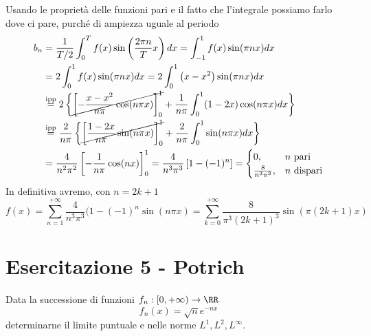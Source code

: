 Usando le proprietà delle funzioni pari e il fatto che l'integrale possiamo farlo dove ci pare, purché di ampiezza uguale al periodo
\begin{equation*}
\begin{aligned}
b_{n} & = \frac{1}{T/2}\int^{T}_{0} f(x)\sin\left(\frac{2\pi n}{T} x\right) dx = \int^{1}_{- 1} f(x)\sin(\pi nx) dx\\
 & = 2\int^{1}_{0} f(x)\sin(\pi nx) dx = 2\int^{1}_{0}\left(x - x^{2}\right)\sin(\pi nx) dx\\
 & \overset{\text{ipp}}{=} 2\left\{\cancel{\left[ - \frac{x - x^{2}}{n\pi}\cos(n\pi x)\right]^{1}_{0}} + \frac{1}{n\pi}\int^{1}_{0}(1 - 2x)\cos(n\pi x) dx\right\}\\
 & \overset{\text{ipp}}{=}\frac{2}{n\pi}\left\{\cancel{\left[\frac{1 - 2x}{n\pi}\sin(n\pi x)\right]^{1}_{0}} + \frac{2}{n\pi}\int^{1}_{0}\sin(n\pi x) dx\right\}\\
 & = \frac{4}{n^{2} \pi^{2}}\left[ - \frac{1}{n\pi}\cos (nx)\right]^{1}_{0} = \frac{4}{n^{3} \pi^{3}}\left[ 1 - (- 1)^{n}\right] =
\begin{cases}
0, & n\ \text{pari}\\
\frac{8}{n^{3} \pi^{3}}, & n\ \text{dispari}
\end{cases}
\end{aligned}
\end{equation*}
In definitiva avremo, con $n = 2k + 1$
\begin{equation*}
f(x) = \sum^{+ \infty}_{n = 1}\frac{4}{n^{3} \pi^{3}} (1 - (- 1)^{n}\sin (n\pi x) = \sum^{+ \infty}_{k = 0}\frac{8}{\pi^{3} (2k + 1)^{3}}\sin (\pi (2k + 1)x)
\end{equation*}
\chapter{Esercitazione 5 - Potrich}

\ParteEsercizi

\Esercizio{}

Data la successione di funzioni $f_{n} :[ 0, + \infty)\rightarrow \RR $
\begin{equation*}
f_{n}(x) = \sqrt{n} e^{- nx}
\end{equation*}
determinarne il limite puntuale e nelle norme $L^{1}, L^{2}, L^{\infty}$.

\Esercizio{}

